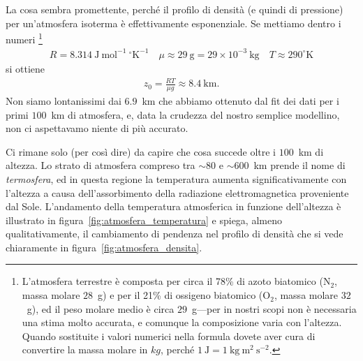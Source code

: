 La cosa sembra promettente, perché il profilo di densità (e quindi di pressione)
per un'atmosfera isoterma è effettivamente esponenziale. Se mettiamo dentro
i numeri%
\footnote{L'atmosfera terrestre è composta per circa il 78\% di azoto biatomico
(N$_2$, massa molare $28$~g) e per il 21\% di ossigeno biatomico (O$_2$, massa
molare $32$~g), ed il peso molare medio è circa $29$~g---per in nostri scopi
non è necessaria una stima molto accurata, e comunque la composizione varia con
l'altezza. Quando sostituite i valori numerici nella formula dovete aver cura di
convertire la massa molare in $kg$, perché
$1~\text{J} = 1~\text{kg}~\text{m}^2~\text{s}^{-2}$.}
\begin{align*}
  R = 8.314~\text{J}~\text{mol}^{-1}~^\circ\text{K}^{-1} \quad
  \mu \approx 29~\text{g} = 29 \times 10^{-3}~\text{kg} \quad
  T \approx 290^\circ\text{K}
\end{align*}
si ottiene
\begin{align*}
  z_0 = \frac{R T}{\mu g} \approx 8.4~\text{km}.
\end{align*}
Non siamo lontanissimi dai $6.9$~km che abbiamo ottenuto dal fit dei dati per
i primi $100$~km di atmosfera, e, data la crudezza del nostro semplice modellino,
non ci aspettavamo niente di più accurato.


Ci rimane solo (per così dire) da capire che cosa succede oltre i $100$~km di altezza.
Lo strato di atmosfera compreso tra $\sim 80$ e $\sim 600$~km prende il nome di
\emph{termosfera}, ed in questa regione la temperatura aumenta significativamente
con l'altezza a causa dell'assorbimento della radiazione elettromagnetica
proveniente dal Sole. L'andamento della temperatura atmosferica in funzione
dell'altezza è illustrato in figura~\ref{fig:atmosfera_temperatura} e spiega,
almeno qualitativamente, il cambiamento di pendenza nel profilo di densità che
si vede chiaramente in figura~\ref{fig:atmosfera_densita}.



